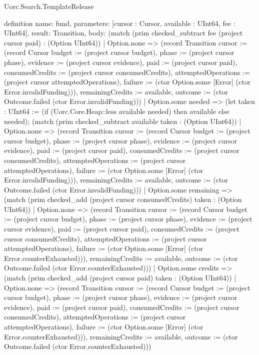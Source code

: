\begin{lexlean}{Uorc.Search.TemplateRelease}
\begin{semanticmodule}
definition{
  name: fund,
  parameters: [cursor : Cursor, available : UInt64, fee : UInt64],
  result: Transition,
  body: (match (prim checked_subtract fee (project cursor paid) : (Option UInt64))
    | Option.none => (record Transition {cursor := (record Cursor {budget := (project cursor budget), phase := (project cursor phase), evidence := (project cursor evidence), paid := (project cursor paid), consumedCredits := (project cursor consumedCredits), attemptedOperations := (project cursor attemptedOperations), failure := (ctor Option.some [Error] (ctor Error.invalidFunding))}), remainingCredits := available, outcome := (ctor Outcome.failed (ctor Error.invalidFunding))})
    | Option.some needed => (let taken : UInt64 := (if (Uorc.Core.Heap::less available needed) then available else needed); (match (prim checked_subtract available taken : (Option UInt64))
      | Option.none => (record Transition {cursor := (record Cursor {budget := (project cursor budget), phase := (project cursor phase), evidence := (project cursor evidence), paid := (project cursor paid), consumedCredits := (project cursor consumedCredits), attemptedOperations := (project cursor attemptedOperations), failure := (ctor Option.some [Error] (ctor Error.invalidFunding))}), remainingCredits := available, outcome := (ctor Outcome.failed (ctor Error.invalidFunding))})
      | Option.some remaining => (match (prim checked_add (project cursor consumedCredits) taken : (Option UInt64))
        | Option.none => (record Transition {cursor := (record Cursor {budget := (project cursor budget), phase := (project cursor phase), evidence := (project cursor evidence), paid := (project cursor paid), consumedCredits := (project cursor consumedCredits), attemptedOperations := (project cursor attemptedOperations), failure := (ctor Option.some [Error] (ctor Error.counterExhausted))}), remainingCredits := available, outcome := (ctor Outcome.failed (ctor Error.counterExhausted))})
        | Option.some credits => (match (prim checked_add (project cursor paid) taken : (Option UInt64))
          | Option.none => (record Transition {cursor := (record Cursor {budget := (project cursor budget), phase := (project cursor phase), evidence := (project cursor evidence), paid := (project cursor paid), consumedCredits := (project cursor consumedCredits), attemptedOperations := (project cursor attemptedOperations), failure := (ctor Option.some [Error] (ctor Error.counterExhausted))}), remainingCredits := available, outcome := (ctor Outcome.failed (ctor Error.counterExhausted))})
}
\end{semanticmodule}
\end{lexlean}
